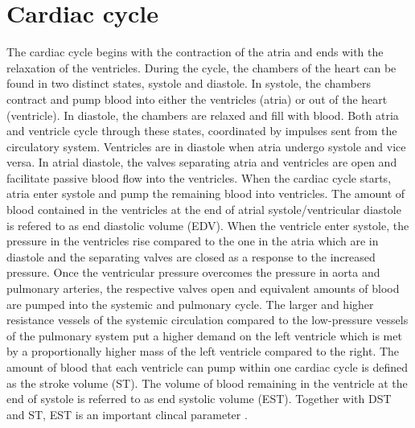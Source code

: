 \section{Cardiac cycle}
The cardiac cycle begins with the contraction of the atria and ends with the relaxation of the ventricles. During the cycle, the chambers of the heart can be found in two distinct states, systole and diastole. In systole, the chambers contract and pump blood into either the ventricles (atria) or out of the heart (ventricle). In diastole, the chambers are relaxed and fill with blood. Both atria and ventricle cycle through these states, coordinated by impulses sent from the circulatory system.  Ventricles are in diastole when atria undergo systole and vice versa. In atrial diastole, the valves separating atria and ventricles are open and facilitate passive blood flow into the ventricles. When the cardiac cycle starts, atria enter systole and pump the remaining blood into ventricles.  The amount of blood contained in the ventricles at the end of atrial systole/ventricular diastole is refered to as end diastolic volume (EDV). When the ventricle enter systole, the pressure in the ventricles rise compared to the one in the atria which are in diastole and the separating valves are closed as a response to the increased pressure. Once the ventricular pressure overcomes the pressure in aorta and pulmonary arteries, the respective valves open and equivalent amounts of blood are pumped into the systemic and pulmonary cycle. The larger and higher resistance vessels of the systemic circulation compared to the low-pressure vessels of the pulmonary system put a higher demand on the left ventricle which is met by a proportionally higher mass of the left ventricle compared to the right. The amount of blood that each ventricle can pump within one cardiac cycle is defined as the stroke volume (ST). The volume of blood remaining in the ventricle at the end of systole is referred to as end systolic volume (EST). Together with DST and ST, EST is an important clincal parameter \citep{Betts2013}. 


